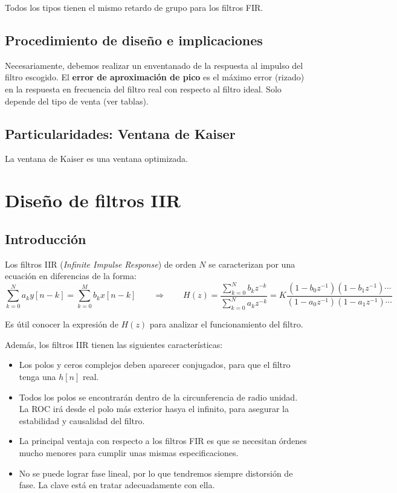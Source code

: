 \documentclass[a4paper,oneside]{book}
\begin{document}
Todos los tipos tienen el mismo retardo de grupo para los filtros FIR.

\subsection{Procedimiento de diseño e implicaciones}

Necesariamente, debemos realizar un enventanado de la respuesta al impulso del filtro escogido. El \textbf{error de aproximación de pico} es el máximo error (rizado) en la respuesta en frecuencia del filtro real con respecto al filtro ideal. Solo depende del tipo de venta (ver tablas).



\subsection{Particularidades: Ventana de Kaiser}

La ventana de Kaiser es una ventana optimizada.

\section{Diseño de filtros IIR}

\subsection{Introducción}

Los filtros IIR (\textit{Infinite Impulse Response}) de orden $N$ se caracterizan por una ecuación en diferencias de la forma:
\[ \sum_{k=0}^{N}a_ky[n-k] = \sum_{k=0}^{M}b_kx[n-k] \qquad \Longrightarrow \qquad H(z) = \frac{\displaystyle{\sum_{k=0}^{N}b_kz^{-k}}}{\displaystyle{\sum_{k=0}^{N}a_kz^{-k}}} = K \frac{\left( 1 - b_0z^{-1} \right)\left( 1 - b_1z^{-1} \right)\cdots}{\left( 1 - a_0z^{-1} \right)\left( 1 - a_1z^{-1} \right)\cdots}\]	

Es útil conocer la expresión de $H(z)$ para analizar el funcionamiento del filtro.

Además, los filtros IIR tienen las siguientes características:
\begin{itemize}
	\item Los polos y ceros complejos deben aparecer conjugados, para que el filtro tenga una $h[n]$ real.
	\item Todos los polos se encontrarán dentro de la circunferencia de radio unidad. La ROC irá desde el polo más exterior hasya el infinito, para asegurar la estabilidad y causalidad del filtro.
	\item La principal ventaja con respecto a los filtros FIR es que se necesitan órdenes mucho menores para cumplir unas mismas especificaciones.
	\item No se puede lograr fase lineal, por lo que tendremos siempre distorsión de fase. La clave está en tratar adecuadamente con ella.
\end{itemize}
\end{document}
